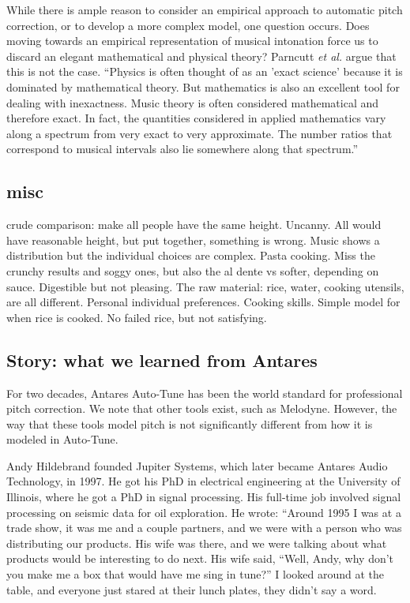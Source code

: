 While there is ample reason to consider an empirical approach to automatic pitch correction, or to develop a more complex model, one question occurs. Does moving towards an empirical representation of musical intonation force us to discard an elegant mathematical and physical theory? Parncutt \textit{et al.} argue that this is not the case. ``Physics is often thought of as an 'exact science' because it is dominated by mathematical theory. But mathematics is also an excellent tool for dealing with inexactness. Music theory is often considered mathematical and therefore exact. In fact, the quantities considered in applied mathematics vary along a spectrum from very exact to very approximate. The number ratios that correspond to musical intervals also lie somewhere along that spectrum.''

\subsection{misc}

crude comparison: make all people have the same height. Uncanny. All would have reasonable height, but put together, something is wrong. Music shows a distribution but the individual choices are complex. Pasta cooking. Miss the crunchy results and soggy ones, but also the al dente vs softer, depending on sauce. Digestible but not pleasing. The raw material: rice, water, cooking utensils, are all different. Personal individual preferences. Cooking skills. Simple model for when rice is cooked. No failed rice, but not satisfying.

\subsection{Story: what we learned from Antares}

For two decades, Antares Auto-Tune has been the world standard for professional pitch correction. We note that other tools exist, such as Melodyne. However, the way that these tools model pitch is not significantly different from how it is modeled in Auto-Tune. \cite{eckard2016}

Andy Hildebrand founded Jupiter Systems, which later became Antares Audio Technology, in 1997. He got his PhD in electrical engineering at the University of Illinois, where he got a PhD in signal processing. His full-time job involved signal processing on seismic data for oil exploration. He wrote: ``Around 1995 I was at a trade show, it was me and a couple partners, and we were with a person who was distributing our products. His wife was there, and we were talking about what products would be interesting to do next. His wife said, ``Well, Andy, why don't you make me a box that would have me sing in tune?'' I looked around at the table, and everyone just stared at their lunch plates, they didn't say a word.

